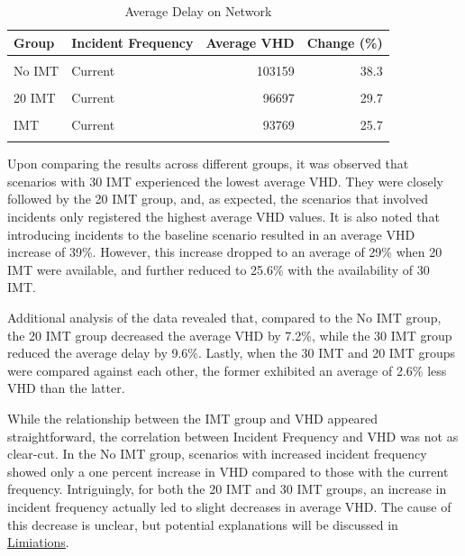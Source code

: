 \documentclass[fancy, oneside, mastersfancy, ms]{byuthesis}
\begin{document}
\hypertarget{tbl-network_delays_table}{}
\begin{table}
\caption{\label{tbl-network_delays_table}Average Delay on Network }\tabularnewline

\centering
\begin{tabular}[t]{llrr}
\toprule
\textbf{Group} & \textbf{Incident Frequency} & \textbf{Average VHD} & \textbf{Change (\%)}\\
\midrule
\cellcolor{gray!6}{Baseline} & \cellcolor{gray!6}{-} & \cellcolor{gray!6}{74568} & \cellcolor{gray!6}{0.0}\\
No IMT & Current & 103159 & 38.3\\
\cellcolor{gray!6}{No IMT} & \cellcolor{gray!6}{Increased} & \cellcolor{gray!6}{104178} & \cellcolor{gray!6}{39.7}\\
20 IMT & Current & 96697 & 29.7\\
\cellcolor{gray!6}{20 IMT} & \cellcolor{gray!6}{Increased} & \cellcolor{gray!6}{95678} & \cellcolor{gray!6}{28.3}\\
\addlinespace
30 IMT & Current & 93769 & 25.7\\
\cellcolor{gray!6}{30 IMT} & \cellcolor{gray!6}{Increased} & \cellcolor{gray!6}{93560} & \cellcolor{gray!6}{25.5}\\
\bottomrule
\end{tabular}
\end{table}

Upon comparing the results across different groups, it was observed that
scenarios with 30 IMT experienced the lowest average VHD. They were
closely followed by the 20 IMT group, and, as expected, the scenarios
that involved incidents only registered the highest average VHD values.
It is also noted that introducing incidents to the baseline scenario
resulted in an average VHD increase of 39\%. However, this increase
dropped to an average of 29\% when 20 IMT were available, and further
reduced to 25.6\% with the availability of 30 IMT.

Additional analysis of the data revealed that, compared to the No IMT
group, the 20 IMT group decreased the average VHD by 7.2\%, while the 30
IMT group reduced the average delay by 9.6\%. Lastly, when the 30 IMT
and 20 IMT groups were compared against each other, the former exhibited
an average of 2.6\% less VHD than the latter.

While the relationship between the IMT group and VHD appeared
straightforward, the correlation between Incident Frequency and VHD was
not as clear-cut. In the No IMT group, scenarios with increased incident
frequency showed only a one percent increase in VHD compared to those
with the current frequency. Intriguingly, for both the 20 IMT and 30 IMT
groups, an increase in incident frequency actually led to slight
decreases in average VHD. The cause of this decrease is unclear, but
potential explanations will be discussed in
\protect\hyperlink{sec-limitations}{Limiations}.
\end{document}
